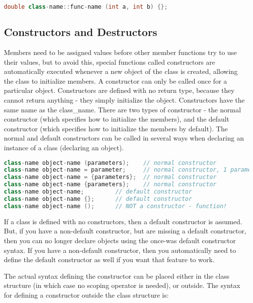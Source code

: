 \documentclass[10pt]{article}
\begin{document}
\begin{lstlisting}[language=C++]
double class-name::func-name (int a, int b) {};
\end{lstlisting}

\subsection{Constructors and Destructors}

Members need to be assigned values before other member functions try to use their values, but to avoid this, special functions called constructors are automatically executed whenever a new object of the class is created, allowing the class to initialize members. A constructor can only be called once for a particular object. Constructors are defined with no return type, because they cannot return anything - they simply initialize the object. Constructors have the same name as the class\_name. There are two types of constructor - the normal constructor (which specifies how to initialize the members), and the default constructor (which specifies how to initialize the members by default). The normal and default constructors can be called in several ways when declaring an instance of a class (declaring an object).

\begin{lstlisting}[language=C++]
class-name object-name (parameters); 	// normal constructor
class-name object-name = parameter; 	// normal constructor, 1 parameter
class-name object-name = {parameters};  // normal constructor
class-name object-name {parameters};	// normal constructor
class-name object-name;			// default constructor
class-name object-name {};		// default constructor
class-name object-name ();		// NOT a constructor - function!
\end{lstlisting}

If a class is defined with no constructors, then a default constructor is assumed. But, if you have a non-default constructor, but are missing a default constructor, then you can no longer declare objects using the once-was default constructor syntax. If you have a non-default constructor, then you automatically need to define the default constructor as well if you want that feature to work.

The actual syntax defining the constructor can be placed either in the class structure (in which case no scoping operator is needed), or outside. The syntax for defining a constructor outside the class structure is:
\end{document}
